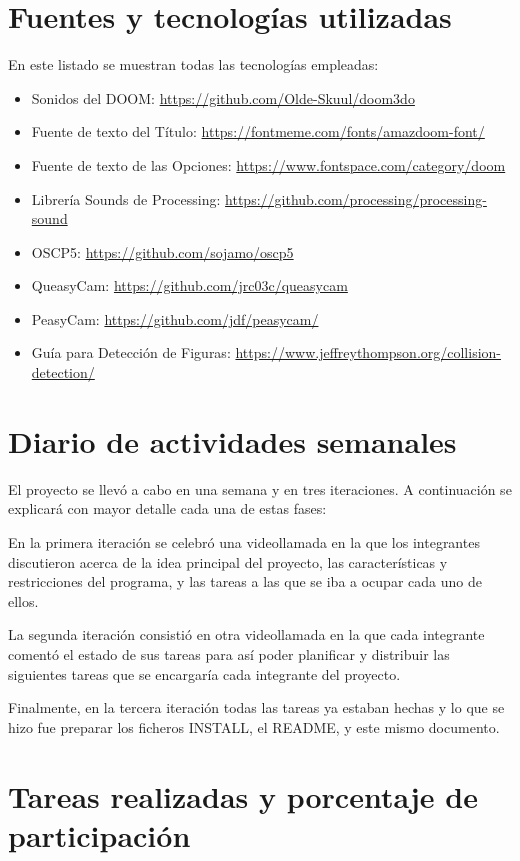 \documentclass{article}
\begin{document}
\section{Fuentes y tecnologías utilizadas}

En este listado se muestran todas las tecnologías empleadas:

\begin{itemize}
    \item Sonidos del DOOM: \url{https://github.com/Olde-Skuul/doom3do}
    \item Fuente de texto del Título: \url{https://fontmeme.com/fonts/amazdoom-font/}
    \item Fuente de texto de las Opciones: \url{https://www.fontspace.com/category/doom}
    \item Librería Sounds de Processing: \url{https://github.com/processing/processing-sound}
    \item OSCP5: \url{https://github.com/sojamo/oscp5}
    \item QueasyCam: \url{https://github.com/jrc03c/queasycam}
    \item PeasyCam: \url{https://github.com/jdf/peasycam/}
    \item Guía para Detección de Figuras: \url{https://www.jeffreythompson.org/collision-detection/}
\end{itemize}

\section{Diario de actividades semanales}

El proyecto se llevó a cabo en una semana y en tres iteraciones. A continuación se explicará
con mayor detalle cada una de estas fases:

En la primera iteración se celebró una videollamada en la que los integrantes discutieron
acerca de la idea principal del proyecto, las características y restricciones del programa,
y las tareas a las que se iba a ocupar cada uno de ellos.

La segunda iteración consistió en otra videollamada en la que cada integrante comentó el
estado de sus tareas para así poder planificar y distribuir las siguientes tareas que se
encargaría cada integrante del proyecto.

Finalmente, en la tercera iteración todas las tareas ya estaban hechas y lo que se hizo
fue preparar los ficheros INSTALL, el README, y este mismo documento.

\section{Tareas realizadas y porcentaje de participación}
\end{document}
